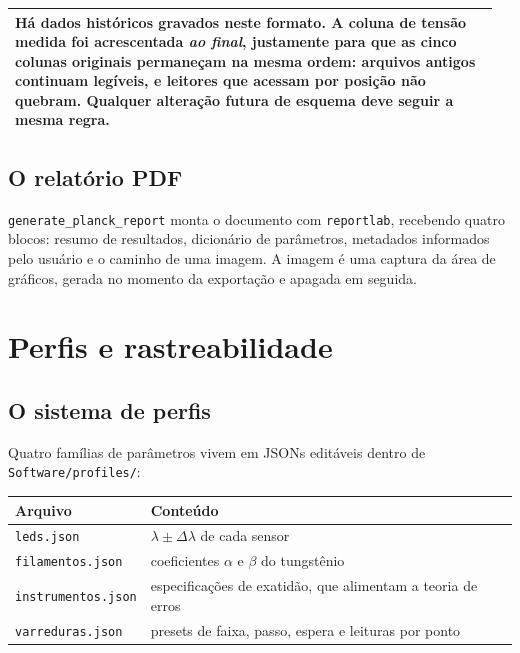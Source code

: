 \documentclass[11pt,a4paper]{article}
\newenvironment{nota}
  {\par\medskip\noindent\begin{tabular}{|p{0.96\linewidth}|}\hline\rule{0pt}{3ex}}
  {\\[1ex]\hline\end{tabular}\par\medskip}
\begin{document}
\begin{nota}
Há dados históricos gravados neste formato. A coluna de tensão medida foi
acrescentada \emph{ao final}, justamente para que as cinco colunas originais
permaneçam na mesma ordem: arquivos antigos continuam legíveis, e leitores que
acessam por posição não quebram. Qualquer alteração futura de esquema deve
seguir a mesma regra.
\end{nota}

\subsection{O relatório PDF}

\texttt{generate\_planck\_report} monta o documento com \texttt{reportlab},
recebendo quatro blocos: resumo de resultados, dicionário de parâmetros,
metadados informados pelo usuário e o caminho de uma imagem. A imagem é uma
captura da área de gráficos, gerada no momento da exportação e apagada em
seguida.

\section{Perfis e rastreabilidade}
\label{sec:perfis}

\subsection{O sistema de perfis}

Quatro famílias de parâmetros vivem em JSONs editáveis dentro de
\texttt{Software/profiles/}:

\begin{center}
\begin{tabular}{@{}p{3.6cm}p{10.8cm}@{}}
\toprule
\textbf{Arquivo} & \textbf{Conteúdo} \\
\midrule
\texttt{leds.json} & $\lambda \pm \Delta\lambda$ de cada sensor \\
\texttt{filamentos.json} & coeficientes $\alpha$ e $\beta$ do tungstênio \\
\texttt{instrumentos.json} & especificações de exatidão, que alimentam a teoria de erros \\
\texttt{varreduras.json} & presets de faixa, passo, espera e leituras por ponto \\
\bottomrule
\end{tabular}
\end{center}
\end{document}
